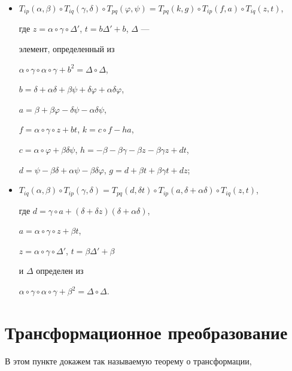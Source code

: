 \begin{itemize} 


\item[a)] $T_{ip}(\alpha,\beta)\circ T_{iq}(\gamma,\delta)\circ 


T_{pq}(\varphi,\psi)=T_{pq}(k,g)\circ T_{ip}(f,a)\circ T_{iq}(z,t)$, 


где $z=\alpha\circ\gamma\circ\Delta'$, $t=b\Delta'+b$, $\Delta$ --- 


элемент, определенный из 


$\alpha\circ\gamma\circ\alpha\circ\gamma+b^2=\Delta\circ\Delta$, 


$b=\delta+\alpha\delta+\beta\psi+\delta\varphi+\alpha\delta\varphi$, 


$a=\beta+\beta\varphi-\delta\psi-\alpha\delta\psi$, 


$f=\alpha\circ\gamma\circ z+b t$, $k=c\circ f-h a$, 


$c=\alpha\circ\varphi+\beta\delta\psi$, $h=-\beta-\beta\gamma-\beta 


z-\beta\gamma z+d t$, 


$d=\psi-\beta\delta+\alpha\psi-\beta\delta\varphi$, $g=d+\beta 


t+\beta\gamma t+d z$; 


\item[b)] $T_{iq}(\alpha,\beta)\circ 


T_{ip}(\gamma,\delta)=T_{pq}(d,\delta t)\circ 


T_{ip}(a,\delta+\alpha\delta)\circ T_{iq}(z,t)$, 


где $d=\gamma\circ a+(\delta+\delta z)(\delta+\alpha\delta)$, 


$a=\alpha\circ\gamma\circ z+\beta t$, 


$z=\alpha\circ\gamma\circ\Delta'$, $t=\beta\Delta'+\beta$ 


и $\Delta$ определен из 


$\alpha\circ\gamma\circ\alpha\circ\gamma+\beta^2=\Delta\circ\Delta$. 


\end{itemize} 


 


\section{Трансформационное преобразование}


 


В этом пункте докажем так называемую теорему о трансформации, 


